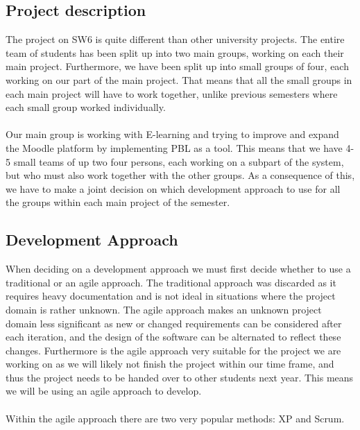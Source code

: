 
\subsection{Project description}
The project on SW6 is quite different than other university projects. The entire team of students has been split up into two main groups, working on each their main project. Furthermore, we have been split up into small groups of four, each working on our part of the main project. That means that all the small groups in each main project will have to work together, unlike previous semesters where each small group worked individually. 

\paragraph{}
Our main group is working with E-learning and trying to improve and expand the Moodle platform by implementing PBL as a tool. This means that we have 4-5 small teams of up two four persons, each working on a subpart of the system, but who must also work together with the other groups. As a consequence of this, we have to make a joint decision on which development approach to use for all the groups within each main project of the semester. 


\subsection{Development Approach}
When deciding on a development approach we must first decide whether to use a traditional or an agile approach.
The traditional approach was discarded as it requires heavy documentation and is not ideal in situations where the project domain is rather unknown. The agile approach makes an unknown project domain less significant as new or changed requirements can be considered after each iteration, and the design of the software can be alternated to reflect these changes. Furthermore is the agile approach very suitable for the project we are working on as we will likely not finish the project within our time frame, and thus the project needs to be handed over to other students next year. This means we will be using an agile approach to develop.

\paragraph{}
Within the agile approach there are two very popular methods: XP and Scrum.

